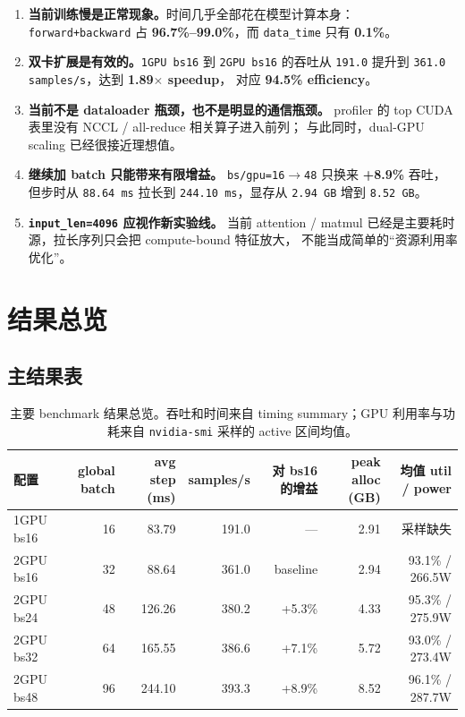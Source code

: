 \documentclass[11pt,a4paper]{ctexart}
\begin{document}
\begin{enumerate}[leftmargin=2em]
  \item \textbf{当前训练慢是正常现象。}时间几乎全部花在模型计算本身：
  \texttt{forward+backward} 占 \textbf{96.7\%--99.0\%}，而 \texttt{data\_time} 只有 \textbf{0.1\%}。
  \item \textbf{双卡扩展是有效的。}\texttt{1GPU bs16} 到 \texttt{2GPU bs16} 的吞吐从
  \texttt{191.0} 提升到 \texttt{361.0 samples/s}，达到 \textbf{1.89$\times$ speedup}，
  对应 \textbf{94.5\% efficiency}。
  \item \textbf{当前不是 dataloader 瓶颈，也不是明显的通信瓶颈。}
  profiler 的 top CUDA 表里没有 NCCL / all-reduce 相关算子进入前列；
  与此同时，dual-GPU scaling 已经很接近理想值。
  \item \textbf{继续加 batch 只能带来有限增益。}
  \texttt{bs/gpu=16$\rightarrow$48} 只换来 \textbf{+8.9\%} 吞吐，但步时从
  \texttt{88.64 ms} 拉长到 \texttt{244.10 ms}，显存从 \texttt{2.94 GB} 增到 \texttt{8.52 GB}。
  \item \textbf{\texttt{input\_len=4096} 应视作新实验线。}
  当前 attention / matmul 已经是主要耗时源，拉长序列只会把 compute-bound 特征放大，
  不能当成简单的“资源利用率优化”。
\end{enumerate}

\section{结果总览}

\subsection{主结果表}

\begin{table}[H]
\centering
\small
\caption{主要 benchmark 结果总览。吞吐和时间来自 timing summary；GPU 利用率与功耗来自 \texttt{nvidia-smi} 采样的 active 区间均值。}
\begin{tabular}{lrrrrrr}
\toprule
配置 & global batch & avg step (ms) & samples/s & 对 bs16 的增益 & peak alloc (GB) & 均值 util / power \\
\midrule
1GPU bs16 & 16 & 83.79 & 191.0 & --- & 2.91 & 采样缺失 \\
2GPU bs16 & 32 & 88.64 & 361.0 & baseline & 2.94 & 93.1\% / 266.5W \\
2GPU bs24 & 48 & 126.26 & 380.2 & +5.3\% & 4.33 & 95.3\% / 275.9W \\
2GPU bs32 & 64 & 165.55 & 386.6 & +7.1\% & 5.72 & 93.0\% / 273.4W \\
2GPU bs48 & 96 & 244.10 & 393.3 & +8.9\% & 8.52 & 96.1\% / 287.7W \\
\bottomrule
\end{tabular}
\end{table}
\end{document}
